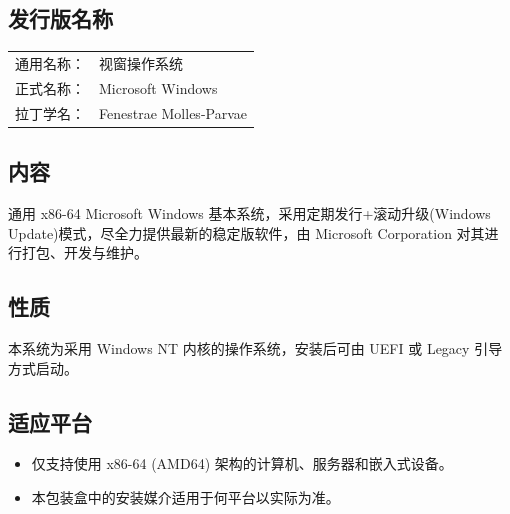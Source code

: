 \documentclass{article}
\begin{document}
\begin{multicols*}{3}
	\begin{tcolorbox}
	\section*{发行版名称}
	\end{tcolorbox}
	\begin{tabularx}{\linewidth}{@{}ll@{}}
		通用名称： & 视窗操作系统 \\
		正式名称： & Microsoft Windows \\
		拉丁学名： & Fenestrae Molles-Parvae \\
	\end{tabularx}

	\medskip


	\begin{tcolorbox}
	\section*{内容}
	\end{tcolorbox}

	通用 x86-64 Microsoft Windows 基本系统，采用定期发行+滚动升级(Windows Update)模式，尽全力提供最新的稳定版软件，由 Microsoft Corporation 对其进行打包、开发与维护。



	\medskip


	\begin{tcolorbox}
	\section*{性质}
	\end{tcolorbox}

	本系统为采用 Windows NT 内核的操作系统，安装后可由 UEFI 或 Legacy 引导方式启动。

	\medskip


	\begin{tcolorbox}
	\section*{适应平台}
	\end{tcolorbox}

	\begin{itemize}
		\item 仅支持使用 x86-64 (AMD64) 架构的计算机、服务器和嵌入式设备。
		\item 本包装盒中的安装媒介适用于何平台以实际为准。
	\end{itemize}



\end{multicols*}
\end{document}
